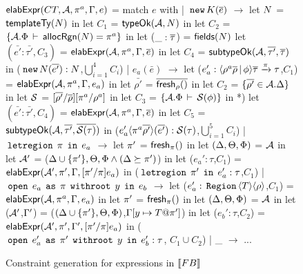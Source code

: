 \begin{figure}

\begin{codeml}
${\sf elabExpr}(CT, {\mathcal{A}}, \pi^a, \Gamma, e)$ = 
  match $e$ with
  | $\,{\tt new}\, K(\overline{e})$ $\longrightarrow$ 
    let $N$ = ${\sf templateTy}(N)$ in
    let $C_1$ = ${\sf typeOk}({{\mathcal{A}}},{N})$ in
    let $C_2$ = $\{{\mathcal{A}}.\Phi\,\vdash\,{\sf allocRgn}(N)=\pi^a\}$ in
    let ($\_:\overline{\tau}$) = ${\sf fields}(N)$
    let $(\bar{e'}:\bar{\tau'}, C_3)$ = ${\sf elabExpr}({\mathcal{A}},\pi^a,\Gamma,\overline{e})$ in
    let $C_4$ = ${\sf subtypeOk}({{\mathcal{A}}},{\overline{\tau'}},{\overline{\tau}})$ in
      ($\,{\tt new}\, N(\overline{e'}) : N$,$\bigcup_{i=1}^4 C_i$)
  | $e_a(\bar{e})$ $\longrightarrow$ 
    let ($e_a':\langle \rho^a\overline{\rho}\,|\,\phi \rangle\overline{\tau} \xrightarrow{\pi} \tau$,$C_1$) = 
                ${\sf elabExpr}({\mathcal{A}},\pi^a,\Gamma,e_a)$ in
    let $\bar{\rho'}$ = $\overline{{\sf fresh}_\rho()}$ in
    let $C_2$ = $\{\overline{\rho'} \in {\mathcal{A}}.\Delta\}$ in
    let $\mathcal{S}$ = $[\overline{\rho'}/\overline{\rho}][\pi^a/\rho^a]$ in
    let $C_3$ = $\{{\mathcal{A}}.\Phi\,\vdash\,\mathcal{S}(\phi)\}$ in
*)   let $(\bar{e'}:\bar{\tau'}, C_4)$ = ${\sf elabExpr}({\mathcal{A}},\pi^a,\Gamma,\overline{e})$ in
    let $C_5$ = ${\sf subtypeOk}({{\mathcal{A}}},{\overline{\tau'}},{\overline{\mathcal{S}(\tau)}})$ in
      ($e_a'\langle \pi^a\overline{\rho'} \rangle(\overline{e'}):\mathcal{S}(\tau)$,$\bigcup_{i=1}^5 C_i$)
  | $\,{\tt letregion}\,\;\pi\;\,{\tt in}\,\;e_a$ $\longrightarrow$
    let $\pi'$ = ${\sf fresh}_{\pi}()$ in 
    let $(\Delta,\Theta,\Phi)$ = ${\mathcal{A}}$ in
    let ${\mathcal{A}}'$ = ($\Delta \cup \{\pi'\}, \Theta, \Phi \wedge (\Delta \succeq \pi')$) in
    let ($e_a':\tau$,$C_1$) = ${\sf elabExpr}({\mathcal{A}}',\pi',\Gamma,[\pi'/\pi]e_a)$ in
      ($\,{\tt letregion}\,\;\pi'\;\,{\tt in}\,\;e_a':\tau$,$C_1$)
  | $\,{\tt open}\,\;e_a\;\,{\tt as}\,\;\pi\;\,{\tt withroot}\,\;y\;\,{\tt in}\,\;e_b$ $\longrightarrow$ 
    let ($e_a':\,{\tt Region}\,\langle T \rangle\langle \rho \rangle$,$C_1$) = 
                ${\sf elabExpr}({\mathcal{A}},\pi^a,\Gamma,e_a)$ in
    let $\pi'$ = ${\sf fresh}_{\pi}()$ in 
    let $(\Delta,\Theta,\Phi)$ = ${\mathcal{A}}$ in
    let (${\mathcal{A}}'$,$\Gamma'$) = ($(\Delta \cup \{\pi'\},\Theta,\Phi)$,$\Gamma[y\mapsto T@\pi']$) in
    let ($e_b':\tau$,$C_2$) = ${\sf elabExpr}({\mathcal{A}}',\pi',\Gamma',[\pi'/\pi]e_a)$ in
      ($\,{\tt open}\,\;e_a'\;\,{\tt as}\,\;\pi'\;\,{\tt withroot}\,\;y\;\,{\tt in}\,\;e_b' : \tau$, $C_1 \cup C_2$)
  | _ $\longrightarrow$ ...
\end{codeml}

\caption{Constraint generation for expressions in $\llbracket {\sc FB} \rrbracket$}
\label{fig:fb-elabexpr}
\end{figure}
